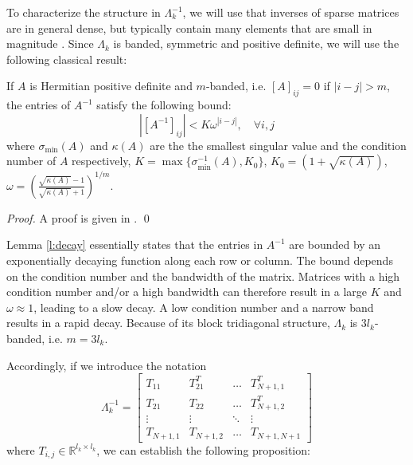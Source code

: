 To characterize the structure in $\Lambda_k^{-1}$, we will use that inverses of sparse matrices are in general dense, but typically contain many elements that are small in magnitude \cite{Benzi2002}. Since $\Lambda_k$ is banded, symmetric and positive definite, we will use the following classical result:
\begin{lemma} \label{l:decay}
If $A$ is Hermitian positive definite and $m$-banded, i.e. $[A]_{ij} = 0$ if $|i-j| > m$, the entries of $A^{-1}$ satisfy the following bound:
\begin{equation}
|[A^{-1}]_{ij}| < K\omega^{|i-j|}, \quad \forall i,j
\end{equation}
where $\sigma_{\min}(A)$ and $\kappa(A)$ are the the smallest singular value and the condition number of $A$ respectively, $K = \max \{ \sigma_{\min}^{-1}(A), K_0 \}$, $K_0 = (1 + \sqrt{\kappa(A)})$, $\omega = \left( \frac{\sqrt{\kappa(A)} - 1}{\sqrt{\kappa(A)} + 1} \right)^{1/m}$.
\end{lemma}
\begin{proof}
A proof is given in \cite{Demko1986}. \qed
\end{proof}
Lemma \ref{l:decay} essentially states that the entries in $A^{-1}$ are bounded by an exponentially decaying function along each row or column. The bound depends on the condition number and the bandwidth of the matrix. Matrices with a high condition number and/or a high bandwidth can therefore result in a large $K$ and $\omega \approx 1$, leading to a slow decay. A low condition number and a narrow band results in a rapid decay. Because of its block tridiagonal structure, $\Lambda_k$ is $3 l_k$-banded, i.e. $m = 3 l_k$.

Accordingly, if we introduce the notation
\begin{equation}
\Lambda_k^{-1} = \left[ \begin{array}{cccc}
T_{11} & T_{21}^T & \hdots & T_{N+1,1}^T \\
T_{21} & T_{22} & \hdots & T_{N+1,2}^T \\
\vdots & \vdots  & \ddots & \vdots \\
T_{N+1,1} & T_{N+1,2} & \hdots & T_{N+1,N+1}
\end{array} \right]
\end{equation}
where $T_{i,j} \in \mathbb{R}^{l_{k} \times l_{k}}$, we can establish the following proposition:

